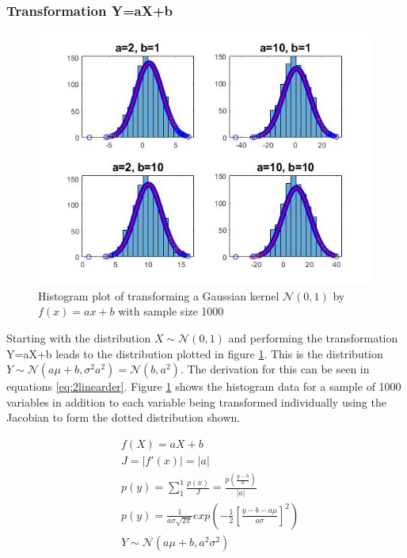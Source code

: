 \documentclass[twoside,twocolumn]{article}
\begin{document}
\subsubsection{Transformation Y=aX+b}
\begin{figure}[h]
  \centering
    \includegraphics[width=\linewidth]{2linear}
  \caption{Histogram plot of transforming a Gaussian kernel $\mathcal{N}(0,1)$ by $f(x)=ax+b$ with sample size 1000}
  \label{fig:2linear}
\end{figure}

Starting with the distribution $X\sim\mathcal{N}(0,1)$ and performing the transformation Y=aX+b leads to the distribution plotted in figure \ref{fig:2linear}. This is the distribution $Y\sim\mathcal{N}(a\mu+b,\sigma^2a^2)=\mathcal{N}(b,a^2)$. The derivation for this can be seen in equations \ref{eq:2linearder}. Figure \ref{fig:2linear} shows the histogram data for a sample of 1000 variables in addition to each variable being transformed individually using the Jacobian to form the dotted distribution shown. 

\begin{equation}
\label{eq:2linearder}
\begin{split}
&f(X)=aX+b\\
&J=|f'(x)|=|a|\\
&p(y) = \sum_{1}^{1} \frac{p(x)}{J} = \frac{p(\frac{y-b}{a})}{|a|} \\
&p(y)=\frac{1}{a\sigma\sqrt{2\pi}}exp(-\frac{1}{2}[\frac{y-b-a\mu}{a\sigma}]^2)\\
&Y\sim\mathcal{N}(a\mu+b,a^2\sigma^2)\\
\end{split}
\end{equation} 
\end{document}
